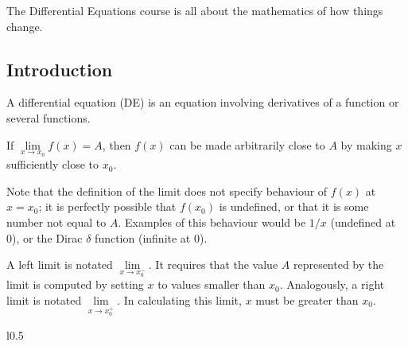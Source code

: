 The Differential Equations course is all about the mathematics of how things change.

\subsection{Introduction}
\begin{definition}
	A differential equation (DE) is an equation involving derivatives of a function or several functions.
\end{definition}
\begin{definition}
	If \(\lim\limits_{x \to x_0} f(x) = A\), then \(f(x)\) can be made arbitrarily close to \(A\) by making \(x\) sufficiently close to \(x_0\).
\end{definition}
Note that the definition of the limit does not specify behaviour of \(f(x)\) at \(x=x_0\); it is perfectly possible that \(f(x_0)\) is undefined, or that it is some number not equal to \(A\).
Examples of this behaviour would be \(1/x\) (undefined at 0), or the Dirac \(\delta\) function (infinite at 0).

\begin{definition}
	A left limit is notated \(\lim\limits_{x \to x_0^-}\).
	It requires that the value \(A\) represented by the limit is computed by setting \(x\) to values smaller than \(x_0\).
	Analogously, a right limit is notated \(\lim\limits_{x \to x_0^+}\).
	In calculating this limit, \(x\) must be greater than \(x_0\).
\end{definition}

\begin{wrapfigure}{l}{0.5\textwidth}
\end{wrapfigure}

